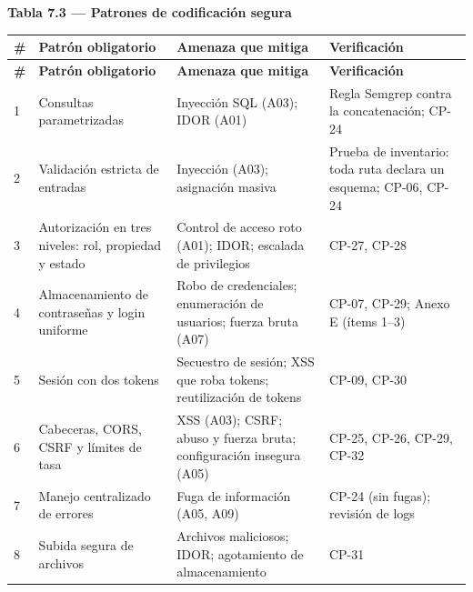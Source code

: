 \documentclass[11pt,a4paper]{article}
\begin{document}
\textbf{Tabla 7.3 --- Patrones de codificación segura}\nopagebreak

\begingroup\small
\begin{longtable}{@{}>{\raggedright\arraybackslash\hspace{0pt}}p{}>{\raggedright\arraybackslash\hspace{0pt}}p{}>{\raggedright\arraybackslash\hspace{0pt}}p{}>{\raggedright\arraybackslash\hspace{0pt}}p{}@{}}
\toprule
\textbf{\#} & \textbf{Patrón obligatorio} & \textbf{Amenaza que mitiga} & \textbf{Verificación} \\ \midrule
\endfirsthead
\toprule
\textbf{\#} & \textbf{Patrón obligatorio} & \textbf{Amenaza que mitiga} & \textbf{Verificación} \\ \midrule
\endhead
\bottomrule
\endlastfoot
\mbox{1} & Consultas parametrizadas & Inyección SQL (A03); IDOR (A01) & Regla Semgrep contra la concatenación; \mbox{CP-24} \\ \addlinespace[0.25em]
\mbox{2} & Validación estricta de entradas & Inyección (A03); asignación masiva & Prueba de inventario: toda ruta declara un esquema; \mbox{CP-06}, \mbox{CP-24} \\ \addlinespace[0.25em]
\mbox{3} & Autorización en tres niveles: rol, propiedad y estado & Control de acceso roto (A01); IDOR; escalada de privilegios & \mbox{CP-27}, \mbox{CP-28} \\ \addlinespace[0.25em]
\mbox{4} & Almacenamiento de contraseñas y login uniforme & Robo de credenciales; enumeración de usuarios; fuerza bruta (A07) & \mbox{CP-07}, \mbox{CP-29}; Anexo E (ítems 1--3) \\ \addlinespace[0.25em]
\mbox{5} & Sesión con dos tokens & Secuestro de sesión; XSS que roba tokens; reutilización de tokens & \mbox{CP-09}, \mbox{CP-30} \\ \addlinespace[0.25em]
\mbox{6} & Cabeceras, CORS, CSRF y límites de tasa & XSS (A03); CSRF; abuso y fuerza bruta; configuración insegura (A05) & \mbox{CP-25}, \mbox{CP-26}, \mbox{CP-29}, \mbox{CP-32} \\ \addlinespace[0.25em]
\mbox{7} & Manejo centralizado de errores & Fuga de información (A05, A09) & \mbox{CP-24} (sin fugas); revisión de logs \\ \addlinespace[0.25em]
\mbox{8} & Subida segura de archivos & Archivos maliciosos; IDOR; agotamiento de almacenamiento & \mbox{CP-31} \\
\end{longtable}
\endgroup
\end{document}
